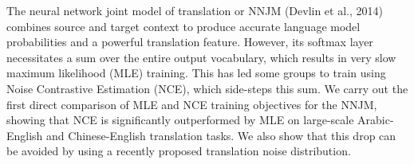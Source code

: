The neural network joint model of translation or NNJM (Devlin et al., 2014) combines source and target context to produce accurate language model probabilities and a powerful translation feature. However, its softmax layer necessitates a sum over the entire output vocabulary, which results in very slow maximum likelihood (MLE) training. This has led some groups to train using Noise Contrastive Estimation (NCE), which side-steps this sum. We carry out the first direct comparison of MLE and NCE training objectives for the NNJM, showing that NCE is significantly outperformed by MLE on large-scale Arabic-English and Chinese-English translation tasks. We also show that this drop can be avoided by using a recently proposed translation noise distribution.
